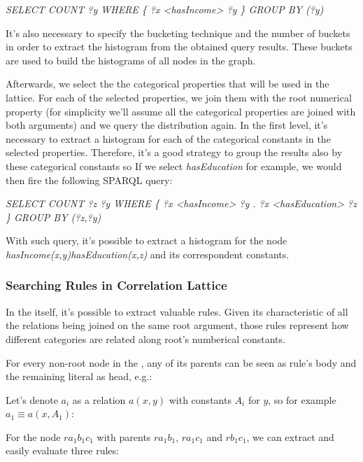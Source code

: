 \begin{center}
 \emph{SELECT COUNT ?y WHERE \{ ?x <hasIncome> ?y \} GROUP BY (?y)}
\end{center}

It's also necessary to specify the bucketing technique and the number of buckets in order to extract the histogram from the obtained query results. These buckets are used to build the histograms of all nodes in the graph.

Afterwards, we select the the categorical properties that will be used in the lattice. For each of the selected properties, we join them with the root numerical property (for simplicity we'll assume all the categorical properties are joined with both  arguments) and we query the distribution again. In the first level, it's necessary to extract a histogram for each of the categorical constants in the selected properties. Therefore, it's a good strategy to group the results also by these categorical constants so If we select \emph{hasEducation} for example, we would then fire the following SPARQL query:

\begin{center}
 \emph{SELECT COUNT ?z ?y WHERE \{ ?x <hasIncome> ?y . ?x <hasEducation> ?z \} GROUP BY (?z,?y)}
\end{center}

With such query, it's possible to extract a histogram for the node \emph{hasIncome(x,y)hasEducation(x,z)} and its correspondent constants. 

\subsubsection{Searching Rules in Correlation Lattice}

In the \graphname itself, it's possible to extract valuable rules. Given its characteristic of all the relations being joined on the same root argument, those rules represent how different categories are related along root's numberical constants.

For every non-root node in the \graphname, any of its parents can be seen as rule's body and the remaining literal as head, e.g.:

Let's denote $a_i$ as a relation $a(x,y)$ with constants $A_i$ for $y$, so for example $a_1 \equiv a(x,A_1)$:

For the node $r a_1 b_1 c_1$ with parents $r a_1 b_1$, $r a_1 c_1$ and $r b_1 c_1$, we can extract and easily evaluate three rules:

